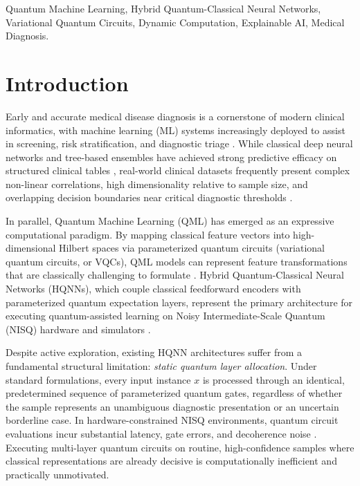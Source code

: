 \documentclass[conference]{IEEEtran}
\begin{document}
\begin{abstract}
hybrid quantum machine learning on structured medical data without asserting quantum supremacy.
\end{abstract}

\begin{IEEEkeywords}
Quantum Machine Learning, Hybrid Quantum-Classical Neural Networks, Variational Quantum Circuits, Dynamic Computation, Explainable AI, Medical Diagnosis.
\end{IEEEkeywords}

\section{Introduction}
Early and accurate medical disease diagnosis is a cornerstone of modern clinical informatics, with machine learning (ML) systems increasingly deployed to assist in screening, risk stratification, and diagnostic triage \cite{biamonte2017quantum, cerezo2021variational, bharti2022noisy}. While classical deep neural networks and tree-based ensembles have achieved strong predictive efficacy on structured clinical tables \cite{chen2016xgboost, gorishniy2021revisiting}, real-world clinical datasets frequently present complex non-linear correlations, high dimensionality relative to sample size, and overlapping decision boundaries near critical diagnostic thresholds \cite{street1993nuclear, detrano1989international, smith1988using}.

In parallel, Quantum Machine Learning (QML) has emerged as an expressive computational paradigm. By mapping classical feature vectors into high-dimensional Hilbert spaces via parameterized quantum circuits (variational quantum circuits, or VQCs), QML models can represent feature transformations that are classically challenging to formulate \cite{schuld2019quantum, havlicek2019supervised, mitarai2018quantum, abbas2021power, huang2022quantum}. Hybrid Quantum-Classical Neural Networks (HQNNs), which couple classical feedforward encoders with parameterized quantum expectation layers, represent the primary architecture for executing quantum-assisted learning on Noisy Intermediate-Scale Quantum (NISQ) hardware and simulators \cite{bergholm2018pennylane, broughton2020tensorflow}.

Despite active exploration, existing HQNN architectures suffer from a fundamental structural limitation: \textit{static quantum layer allocation}. Under standard formulations, every input instance $x$ is processed through an identical, predetermined sequence of parameterized quantum gates, regardless of whether the sample represents an unambiguous diagnostic presentation or an uncertain borderline case. In hardware-constrained NISQ environments, quantum circuit evaluations incur substantial latency, gate errors, and decoherence noise \cite{mcclean2018barren, cerezo2021variational}. Executing multi-layer quantum circuits on routine, high-confidence samples where classical representations are already decisive is computationally inefficient and practically unmotivated.
\end{document}
